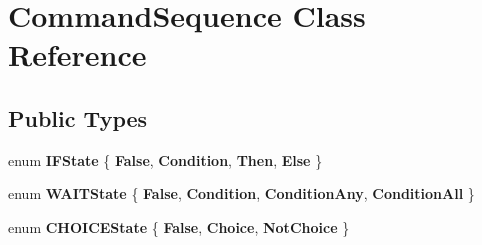 \hypertarget{class_command_sequence}{}\section{Command\+Sequence Class Reference}
\label{class_command_sequence}
\subsection*{Public Types}
\begin{DoxyCompactItemize}
\item 
enum {\bfseries I\+F\+State} \{ {\bfseries False}, 
{\bfseries Condition}, 
{\bfseries Then}, 
{\bfseries Else}
 \}\hypertarget{class_command_sequence_a6e011a1e2a227e35f01d2cfca4317f01}{}\label{class_command_sequence_a6e011a1e2a227e35f01d2cfca4317f01}

\item 
enum {\bfseries W\+A\+I\+T\+State} \{ {\bfseries False}, 
{\bfseries Condition}, 
{\bfseries Condition\+Any}, 
{\bfseries Condition\+All}
 \}\hypertarget{class_command_sequence_a6963cfe8aa56995c00e22876e7d577f2}{}\label{class_command_sequence_a6963cfe8aa56995c00e22876e7d577f2}

\item 
enum {\bfseries C\+H\+O\+I\+C\+E\+State} \{ {\bfseries False}, 
{\bfseries Choice}, 
{\bfseries Not\+Choice}
 \}\hypertarget{class_command_sequence_aac8973304c0f788b69b6ebb1c6bd16a8}{}\label{class_command_sequence_aac8973304c0f788b69b6ebb1c6bd16a8}

\end{DoxyCompactItemize}
